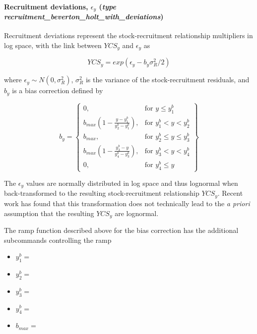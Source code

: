 \paragraph*{Recruitment deviations, $\epsilon_y$ (\emph{type recruitment\_beverton\_holt\_with\_deviations})} \label{sec:Process-RecruitmentBevertonHoltWithDeviations} 

Recruitment deviations represent the stock-recruitment relationship multipliers in log space, with the link between $YCS_y$ and $\epsilon_y$ as

\begin{equation}\label{eq:recruit_devs}
	YCS_y = exp(\epsilon_y - b_y\sigma^2_R / 2)
\end{equation}

where $\epsilon_y\sim N(0,\sigma^2_R)$, $\sigma^2_R$ is the variance of the stock-recruitment residuals, and $b_y$ is a bias correction defined by \cite{methot2011adjusting}

\begin{equation}\label{eq::bias}
b_y = \left\{\begin{array}{lr}
0, & \text{for }y\leq y_1^b\\
b_{max}(1 - \frac{y - y_1^b}{y_2^b - y_1^b}), & \text{for } y_1^b < y < y_2^b\\
b_{max}, & \text{for } y_2^b\leq y \leq y_3^b\\
b_{max}(1 - \frac{y_3^b - y}{y_4^b - y_3^b}), & \text{for }  y_3^b< y < y_4^b\\
0, & \text{for } y_4^b\leq y
\end{array}\right\}
\end{equation}

The $\epsilon_y$ values are normally distributed in log space and thus lognormal when back-transformed to the resulting stock-recruitment relationship $YCS_y$. Recent work has found that this transformation does not technically lead to the \textit{a priori} assumption that the resulting $YCS_y$ are lognormal. 

The ramp function described above for the bias correction has the additional subcommands controlling the ramp

\begin{itemize}
	\item $y_1^b = $ 
	\item $y_2^b = $ 
	\item $y_3^b = $ 
	\item $y_4^b = $ 
	\item $b_{max} = $ 
\end{itemize}

